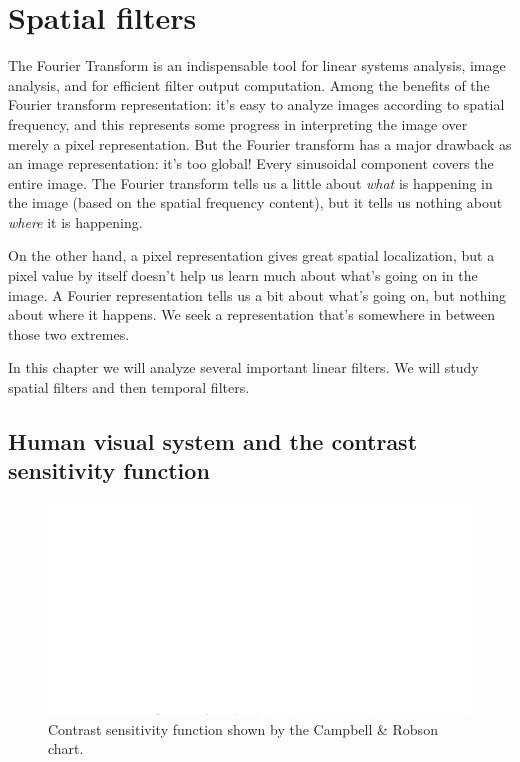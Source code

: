 
\chapter{Spatial filters}

The Fourier Transform is an indispensable tool for linear systems analysis,
image analysis, and for efficient filter output computation.
Among the benefits of the Fourier transform representation:  it's easy
to analyze images according to spatial frequency, and this represents some
progress in interpreting the image over merely a
pixel representation.  But the Fourier transform has a major drawback
as an image representation: it's too global!  Every sinusoidal
component covers the entire image.  The Fourier transform tells us a
little about {\em what} is happening in the image (based on the spatial
frequency content), but it tells us nothing about {\em where} it is happening.

On the other hand, a pixel representation gives great spatial localization, but a pixel
value by itself doesn't help us learn much about what's going on in
the image.  A Fourier representation tells us a bit about what's going
on, but nothing about where it happens.  We seek a representation
that's somewhere in between those two extremes.



In this chapter we will analyze several important linear filters. We will study spatial filters and then temporal filters.



\section{Human visual system and the contrast sensitivity function}

\begin{figure}
	\centerline{
		\includegraphics[width=1\linewidth]{figures/spatial_filters/csf.png}
	}
	\caption{Contrast sensitivity function shown by the Campbell \& Robson chart.}
	\label{fig:csfchart}
\end{figure}


